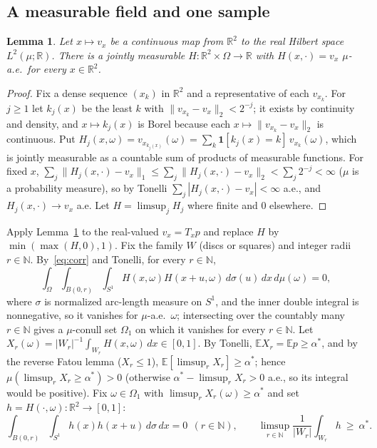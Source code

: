 \documentclass[11pt]{amsart}
\newtheorem{lemma}[theorem]{Lemma}
\theoremstyle{definition}
\theoremstyle{remark}
\newcommand{\R}{\mathbb{R}}
\newcommand{\N}{\mathbb{N}}
\newcommand{\E}{\mathbb{E}}
\newcommand{\one}{\mathbf 1}
\begin{document}
\subsection{A measurable field and one sample}

\begin{lemma}\label{lem:field}
Let $x\mapsto v_x$ be a continuous map from $\R^2$ to the real Hilbert space $L^2(\mu;\R)$. There is a jointly measurable $H:\R^2\times\Omega\to\R$ with $H(x,\cdot)=v_x$ $\mu$-a.e.\ for every $x\in\R^2$.
\end{lemma}

\begin{proof}
Fix a dense sequence $(x_k)$ in $\R^2$ and a representative of each $v_{x_k}$. For $j\ge1$ let $k_j(x)$ be the least $k$ with $\|v_{x_k}-v_x\|_2<2^{-j}$; it exists by continuity and density, and $x\mapsto k_j(x)$ is Borel because each $x\mapsto\|v_{x_k}-v_x\|_2$ is continuous. Put $H_j(x,\omega)=v_{x_{k_j(x)}}(\omega)=\sum_k\one[k_j(x)=k]\,v_{x_k}(\omega)$, which is jointly measurable as a countable sum of products of measurable functions. For fixed $x$, $\sum_j\|H_j(x,\cdot)-v_x\|_1\le\sum_j\|H_j(x,\cdot)-v_x\|_2<\sum_j2^{-j}<\infty$ ($\mu$ is a probability measure), so by Tonelli $\sum_j|H_j(x,\cdot)-v_x|<\infty$ a.e., and $H_j(x,\cdot)\to v_x$ a.e. Let $H=\limsup_jH_j$ where finite and $0$ elsewhere.
\end{proof}

Apply Lemma~\ref{lem:field} to the real-valued $v_x=T_xp$ and replace $H$ by $\min(\max(H,0),1)$. Fix the family $W$ (discs or squares) and integer radii $r\in\N$. By~\eqref{eq:corr} and Tonelli, for every $r\in\N$,
\[
  \int_\Omega\int_{B(0,r)}\int_{S^1}H(x,\omega)H(x+u,\omega)\,d\sigma(u)\,dx\,d\mu(\omega)=0,
\]
where $\sigma$ is normalized arc-length measure on $S^1$,
and the inner double integral is nonnegative, so it vanishes for $\mu$-a.e.\ $\omega$; intersecting over the countably many $r\in\N$ gives a $\mu$-conull set $\Omega_1$ on which it vanishes for every $r\in\N$. Let $X_r(\omega)=|W_r|^{-1}\int_{W_r}H(x,\omega)\,dx\in[0,1]$. By Tonelli, $\E X_r=\E p\ge\alpha^*$, and by the reverse Fatou lemma ($X_r\le1$), $\E[\limsup_rX_r]\ge\alpha^*$; hence $\mu(\limsup_rX_r\ge\alpha^*)>0$ (otherwise $\alpha^*-\limsup_rX_r>0$ a.e., so its integral would be positive). Fix $\omega\in\Omega_1$ with $\limsup_rX_r(\omega)\ge\alpha^*$ and set $h=H(\cdot,\omega):\R^2\to[0,1]$:
\begin{equation}\label{eq:sample}
  \int_{B(0,r)}\int_{S^1}h(x)h(x+u)\,d\sigma\,dx=0\ \ (r\in\N),\qquad
  \limsup_{r\in\N}\frac1{|W_r|}\int_{W_r}h\ \ge\ \alpha^*.
\end{equation}
\end{document}
